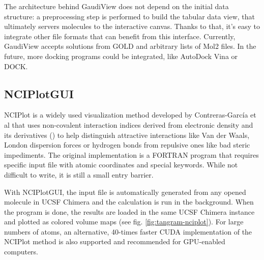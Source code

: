 The architecture behind GaudiView does not depend on the initial data structure: a preprocessing step is performed to build the tabular data view, that ultimately servers molecules to the interactive canvas. Thanks to that, it’s easy to integrate other file formats that can benefit from this interface. Currently, GaudiView accepts solutions from GOLD and arbitrary lists of Mol2 files. In the future, more docking programs could be integrated, like AutoDock Vina or DOCK.

\subsection{NCIPlotGUI}
NCIPlot is a widely used visualization method developed by Contreras-García et al\cite{nciplot} that uses non-covalent interaction indices derived from electronic density and its derivatives () to help distinguish attractive interactions like Van der Waals, London dispersion forces or hydrogen bonds from repulsive ones like bad steric impediments. The original implementation is a FORTRAN program that requires specific input file with atomic coordinates and special keywords. While not difficult to write, it is still a small entry barrier.

With NCIPlotGUI, the input file is automatically generated from any opened molecule in UCSF Chimera and the calculation is run in the background. When the program is done, the results are loaded in the same UCSF Chimera instance and plotted as colored volume maps (see fig. \ref{fig:tangram-nciplot}). For large numbers of atoms, an alternative, 40-times faster CUDA implementation of the NCIPlot method\cite{nciplotcuda} is also supported and recommended for GPU-enabled computers.



